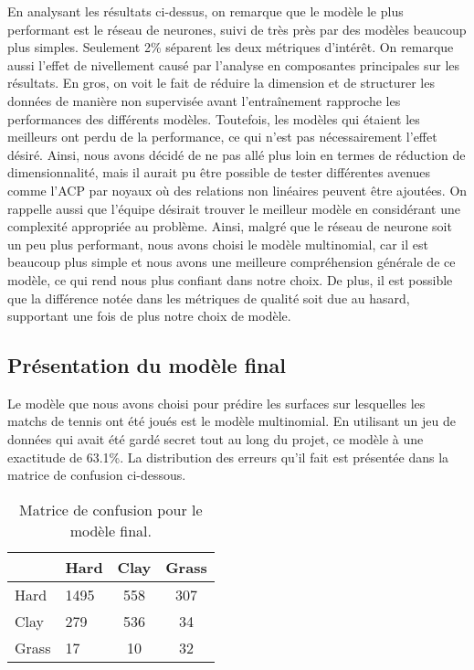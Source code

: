En analysant les résultats ci-dessus, on remarque que le modèle le plus performant est le réseau de neurones, suivi de très près par des modèles beaucoup plus simples. Seulement 2\% séparent les deux métriques d'intérêt. On remarque aussi l'effet de nivellement causé par l'analyse en composantes principales sur les résultats. En gros, on voit le fait de réduire la dimension et de structurer les données de manière non supervisée avant l'entraînement rapproche les performances des différents modèles. Toutefois, les modèles qui étaient les meilleurs ont perdu de la performance, ce qui n'est pas nécessairement l'effet désiré. Ainsi, nous avons décidé de ne pas allé plus loin en termes de réduction de dimensionnalité, mais il aurait pu être possible de tester différentes avenues comme l'ACP par noyaux où des relations non linéaires peuvent être ajoutées. On rappelle aussi que l'équipe désirait trouver le meilleur modèle en considérant une complexité appropriée au problème. Ainsi, malgré que le réseau de neurone soit un peu plus performant, nous avons choisi le modèle multinomial, car il est beaucoup plus simple et nous avons une meilleure compréhension générale de ce modèle, ce qui rend nous plus confiant dans notre choix. De plus, il est possible que la différence notée dans les métriques de qualité soit due au hasard, supportant une fois de plus notre choix de modèle. 
 
\subsection{Présentation du modèle final}
Le modèle que nous avons choisi pour prédire les surfaces sur lesquelles les matchs de tennis ont été joués est le modèle multinomial. En utilisant un jeu de données qui avait été gardé secret tout au long du projet, ce modèle à une exactitude de 63.1\%. La distribution des erreurs qu'il fait est présentée dans la matrice de confusion ci-dessous.

\begin{table}[H]
	
	\caption{\label{tab:matrice_confusion}Matrice de confusion pour le modèle final.}
	\centering
	\begin{tabular}[t]{llcc}
		\hiderowcolors
		\toprule
		& Hard & Clay & Grass\\
		\midrule
		\showrowcolors
		Hard & 1495 & 558 & 307\\
		Clay & 279 & 536 & 34\\
		Grass & 17 & 10 & 32\\
		\bottomrule
	\end{tabular}
\end{table}


